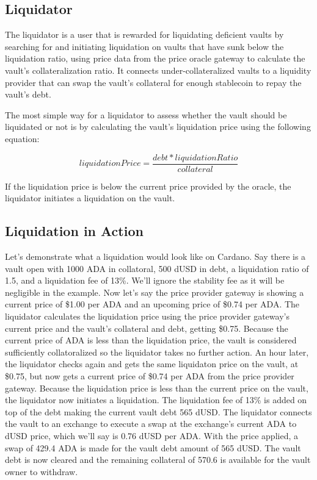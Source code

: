 \documentclass[12pt]{article}
\begin{document}
\subsection{Liquidator}

The liquidator is a user that is rewarded for liquidating deficient vaults by searching for and initiating liquidation on vaults that have sunk below the liquidation ratio, using price data from the price oracle gateway to calculate the vault's collateralization ratio. It connects under-collateralized vaults to a liquidity provider that can swap the vault's collateral for enough stablecoin to repay the vault's debt.

The most simple way for a liquidator to assess whether the vault should be liquidated or not is by calculating the vault's liquidation price using the following equation:

\begin{equation*}
	liquidationPrice = \frac{debt * liquidationRatio}{collateral}
\end{equation*}

If the liquidation price is below the current price provided by the oracle, the liquidator initiates a liquidation on the vault.

\subsection{Liquidation in Action}

Let's demonstrate what a liquidation would look like on Cardano. Say there is a vault open with 1000 ADA in collatoral, 500 dUSD in debt, a liquidation ratio of 1.5, and a liquidation fee of 13\%. We'll ignore the stability fee as it will be negligible in the example. Now let's say the price provider gateway is showing a current price of \$1.00 per ADA and an upcoming price of \$0.74 per ADA. The liquidator calculates the liquidation price using the price provider gateway's current price and the vault's collateral and debt, getting \$0.75. Because the current price of ADA is less than the liquidation price, the vault is considered sufficiently collatoralized so the liquidator takes no further action. An hour later, the liquidator checks again and gets the same liquidaton price on the vault, at \$0.75, but now gets a current price of \$0.74 per ADA from the price provider gateway. Because the liquidation price is less than the current price on the vault, the liquidator now initiates a liquidation. The liquidation fee of 13\% is added on top of the debt making the current vault debt 565 dUSD. The liquidator connects the vault to an exchange to execute a swap at the exchange's current ADA to dUSD price, which we'll say is 0.76 dUSD per ADA. With the price applied, a swap of 429.4 ADA is made for the vault debt amount of 565 dUSD. The vault debt is now cleared and the remaining collateral of 570.6 is available for the vault owner to withdraw.
\end{document}
